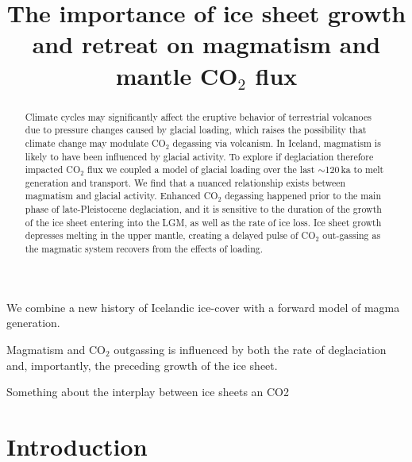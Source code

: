 \documentclass[draft,linenumbers]{agujournal2018}
\begin{document}
\title{The importance of ice sheet growth and retreat on magmatism and mantle CO$_2$ flux}





\begin{keypoints}
\item We combine a new history of Icelandic ice-cover with a forward model of magma generation.
\item Magmatism and CO$_{2}$ outgassing is influenced by both the rate of deglaciation and, importantly, the preceding growth of the ice sheet.
\item Something about the interplay between ice sheets an CO2
\end{keypoints}

\begin{abstract}
Climate cycles may significantly affect the eruptive behavior of terrestrial volcanoes due to pressure changes caused by glacial loading, which raises the possibility that climate change may modulate CO$_{2}$ degassing via volcanism. In Iceland, magmatism is likely to have been influenced by glacial activity. To explore if deglaciation therefore impacted CO$_{2}$ flux we coupled a model of glacial loading over the last $\sim$120\,ka to melt generation and transport. We find that a nuanced relationship exists between magmatism and glacial activity. Enhanced CO$_{2}$ degassing happened prior to the main phase of late-Pleistocene deglaciation, and it is sensitive to the duration of the growth of the ice sheet entering into the LGM, as well as the rate of ice loss. Ice sheet growth depresses melting in the upper mantle, creating a delayed pulse of CO$_{2}$ out-gassing as the magmatic system recovers from the effects of loading.
\end{abstract}

\section{Introduction}
\end{document}
